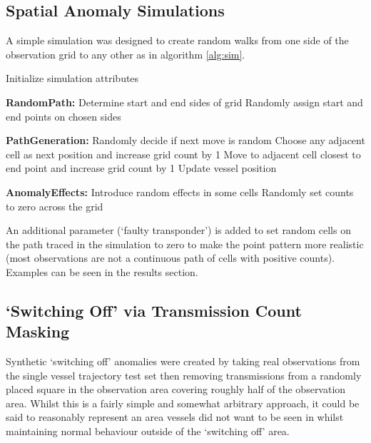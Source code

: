 \documentclass{mldsmsc}
\begin{document}
\subsection{Spatial Anomaly Simulations}
A simple simulation was designed to create random walks from one side of the observation grid  to any other as in algorithm \ref{alg:sim}.

\begin{algorithm}[H]
	\caption{Vessel Simulation}
	\begin{algorithmic}[1]
		\State Initialize simulation attributes
		
		\State \textbf{RandomPath:}
		\State \quad Determine start and end sides of grid
		\State \quad Randomly assign start and end points on chosen sides
		
		\State \textbf{PathGeneration:}
		\State \quad Randomly decide if next move is random
		\State \quad Choose any adjacent cell as next position and increase grid count by 1
		\Else
		\State \quad Move to adjacent cell closest to end point and increase grid count by 1
		\EndIf
		\State \quad Update vessel position
		\EndWhile
		
		\State \textbf{AnomalyEffects:}
		\State \quad Introduce random effects in some cells
		\State \quad Randomly set counts to zero across the grid
		\EndIf
		\EndProcedure
	\end{algorithmic}
	\label{alg:sim}
\end{algorithm}

An additional parameter (`faulty transponder') is added to set random cells on the path traced in the simulation to zero to make the point pattern more realistic (most observations are not a continuous path of cells with positive counts). Examples can be seen in the results section.

\subsection{`Switching Off' via Transmission Count Masking}\label{sec:switching_off}
Synthetic `switching off' anomalies were created by taking real observations from the single vessel trajectory test set then removing transmissions from a randomly placed square in the observation area covering roughly half of the observation area.  Whilst this is a fairly simple and somewhat arbitrary approach, it could be said to reasonably represent an area vessels did not want to be seen in whilst maintaining normal behaviour outside of the `switching off' area.
\end{document}
